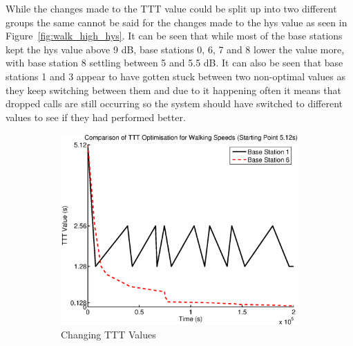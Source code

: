 While the changes made to the TTT value could be split up into two different groups the same cannot be said for the changes made to the hys value as seen in Figure~\ref{fig:walk_high_hys}. It can be seen that while most of the base stations kept the hys value above 9 dB, base stations 0, 6, 7 and 8 lower the value more, with base station 8 settling between 5 and 5.5 dB. It can also be seen that base stations 1 and 3 appear to have gotten stuck between two non-optimal values as they keep switching between them and due to it happening often it means that dropped calls are still occurring so the system should have switched to different values to see if they had performed better.
\begin{figure}[H]
        \centering
        \begin{subfigure}[b]{0.49\textwidth}
                \includegraphics[width=\textwidth]{figures/walking_figures/high/long_ttt.eps}
                \caption{Changing TTT Values}
                \label{fig:walk_high_ttt}
        \end{subfigure}%
        ~ %
        \begin{subfigure}[b]{0.49\textwidth}

\end{subfigure}
\end{figure}
